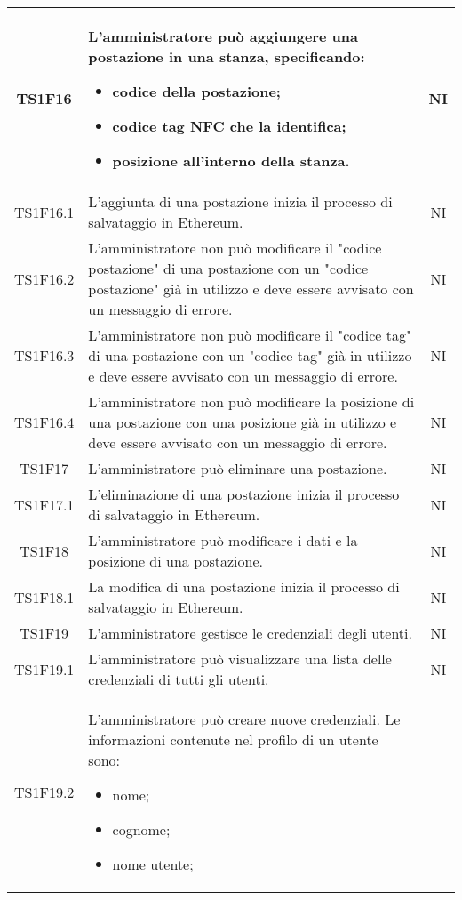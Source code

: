 \begin{center}
\begin{longtable}{|c|p{10cm}|c|}
			\hline
			TS1F16 & L'amministratore può aggiungere una postazione in una stanza, specificando:
			\begin{itemize}
				\item codice della postazione;
				\item codice tag NFC che la identifica;
				\item posizione all'interno della stanza.
			\end{itemize}
			& NI \\			
			\hline			
			TS1F16.1 & L'aggiunta di una postazione inizia il processo di salvataggio in Ethereum. & NI \\			
			\hline				
			TS1F16.2 & L'amministratore non può modificare il "codice postazione" di una postazione con un "codice postazione" già in utilizzo e deve essere avvisato con un messaggio di errore. & NI \\			
			\hline			
			TS1F16.3 & L'amministratore non può modificare il "codice tag" di una postazione con un "codice tag" già in utilizzo e deve essere avvisato con un messaggio di errore. & NI \\			
			\hline			
			TS1F16.4 & L'amministratore non può modificare la posizione di una postazione con una posizione già in utilizzo e deve essere avvisato con un messaggio di errore. & NI \\			
			\hline
			TS1F17 & L'amministratore può eliminare una postazione. & NI \\			
			\hline		
			TS1F17.1 & L'eliminazione di una postazione inizia il processo di salvataggio in Ethereum. & NI \\			
			\hline	
			TS1F18 & L'amministratore può modificare i dati e la posizione di una postazione. & NI \\			
			\hline	
			TS1F18.1 & La modifica di una postazione inizia il processo di salvataggio in Ethereum. & NI \\			
			\hline	
			TS1F19 & L'amministratore gestisce le credenziali degli utenti. & NI \\	
			\hline
			TS1F19.1 & L'amministratore può visualizzare una lista delle credenziali di tutti gli utenti. & NI \\	
			\hline
			TS1F19.2 & L'amministratore può creare nuove credenziali. Le informazioni contenute nel profilo di un utente sono:
			\begin{itemize}
				\item nome;
				\item cognome;
				\item nome utente;

\end{itemize}
\end{longtable}
\end{center}
